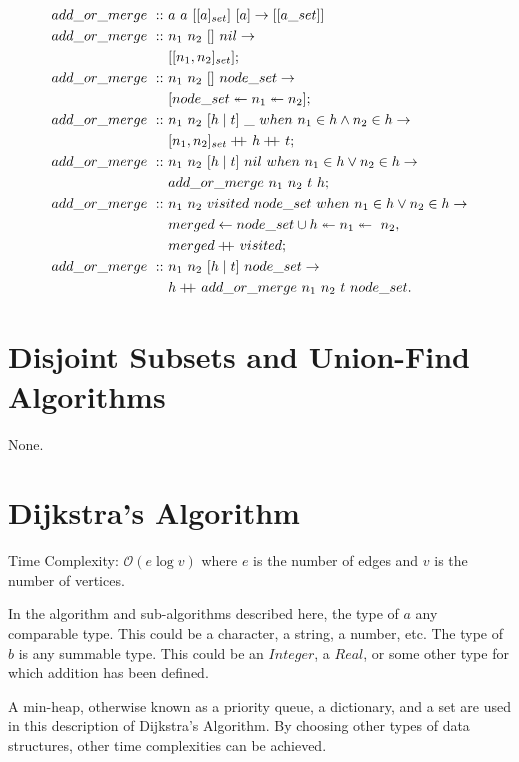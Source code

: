 \documentclass[a4paper,10pt]{book}
\newcommand\when{\  when\ }
\newcommand\doubleplus{+\kern-1.3ex+\kern0.8ex}
\begin{document}
\begin{align*}
add\_or\_merge\ ::\ &a\ a\ [[a]_{set}]\ [a]\rightarrow [[a\_{set}]]\\
add\_or\_merge\ ::\ &n_1\ n_2\ []\ nil\rightarrow\\
	&[[n_1,n_2]_{set}];\\
	add\_or\_merge\ ::\ &n_1\ n_2\ []\ node\_set\rightarrow\\
	&[node\_set\twoheadleftarrow n_1\twoheadleftarrow n_2];\\
add\_or\_merge\ ::\ &n_1\ n_2\ [h\mid t]\ \_\when n_1\in h\land n_2\in h\rightarrow\\
	&[n_1,n_2]_{set}\doubleplus h\doubleplus t;\\
add\_or\_merge\ ::\ &n_1\ n_2\ [h\mid t]\ nil\when n_1\in h\lor n_2\in h\rightarrow\\
	&add\_or\_merge\ n_1\ n_2\ t\ h;\\
add\_or\_merge\ ::\ &n_1\ n_2\ visited\ node\_set\when n_1\in h\lor n_2\in h\rightarrow\\
	&merged\leftarrow node\_set\cup h\twoheadleftarrow n_1\twoheadleftarrow\ n_2,\\
	&merged\doubleplus visited;\\
add\_or\_merge\ ::\ &n_1\ n_2\ [h\mid t]\ node\_set\rightarrow\\
	&h\doubleplus add\_or\_merge\ n_1\ n_2\ t\ node\_set.
\end{align*}

\section{Disjoint Subsets and Union-Find Algorithms}
None.
\section{Dijkstra's Algorithm}
Time Complexity: $\mathcal{O}(e\log v)$ where $e$ is the number of edges and $v$ is the number of vertices.

In the algorithm and sub-algorithms described here, the type of $a$ any comparable type. This could be a character, a string, a number, etc. The type of $b$ is any summable type. This could be an $Integer$, a $Real$, or some other type for which addition has been defined.

A min-heap, otherwise known as a priority queue, a dictionary, and a set are used in this description of Dijkstra's Algorithm. By choosing other types of data structures, other time complexities can be achieved.
\end{document}
